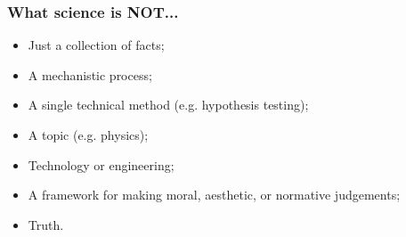 \documentclass[aspectratio=169]{beamer}
\theoremstyle{principle}
\begin{document}
\begin{frame}
\frametitle{What science is NOT...}
\begin{itemize}
\item Just a collection of facts;
\bigskip
\item A mechanistic process;
\bigskip
\item A single technical method (e.g. hypothesis testing);
\bigskip
\item A topic (e.g. physics);
\bigskip
\item Technology or engineering;
\bigskip
\item A framework for making moral, aesthetic, or normative judgements;
\bigskip
\item Truth.
\end{itemize}

\end{frame}
\end{document}
